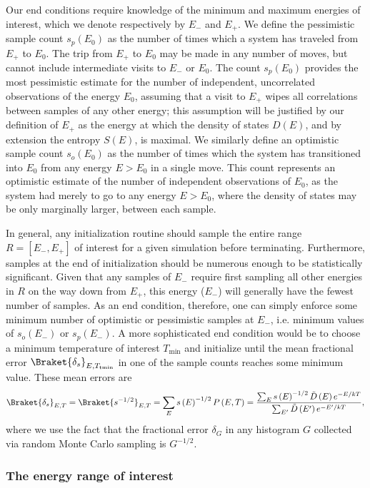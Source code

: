 \documentclass[11pt]{article}
\newcommand{\bk}{\Braket} %
\renewcommand{\t}{\text} %
\newcommand{\f}[2]{\dfrac{#1}{#2}} %
\newcommand{\p}[1]{\left(#1\right)} %
\renewcommand{\sp}[1]{\left[#1\right]} %
\begin{document}
Our end conditions require knowledge of the minimum and maximum
energies of interest, which we denote respectively by $E_-$ and $E_+$.
We define the pessimistic sample count $s_p\p{E_0}$ as the number of
times which a system has traveled from $E_+$ to $E_0$. The trip from
$E_+$ to $E_0$ may be made in any number of moves, but cannot include
intermediate visits to $E_-$ or $E_0$. The count $s_p\p{E_0}$ provides
the most pessimistic estimate for the number of independent,
uncorrelated observations of the energy $E_0$, assuming that a visit
to $E_+$ wipes all correlations between samples of any other energy;
this assumption will be justified by our definition of $E_+$ as the
energy at which the density of states $D\p{E}$, and by extension the
entropy $S\p{E}$, is maximal. We similarly define an optimistic sample
count $s_o\p{E_0}$ as the number of times which the system has
transitioned into $E_0$ from any energy $E>E_0$ in a single move. This
count represents an optimistic estimate of the number of independent
observations of $E_0$, as the system had merely to go to any energy
$E>E_0$, where the density of states may be only marginally larger,
between each sample.

In general, any initialization routine should sample the entire range
$R=\sp{E_-,E_+}$ of interest for a given simulation before
terminating. Furthermore, samples at the end of initialization should
be numerous enough to be statistically significant. Given that any
samples of $E_-$ require first sampling all other energies in $R$ on
the way down from $E_+$, this energy ($E_-$) will generally have the
fewest number of samples. As an end condition, therefore, one can
simply enforce some minimum number of optimistic or pessimistic
samples at $E_-$, i.e. minimum values of $s_o\p{E_-}$ or
$s_p\p{E_-}$. A more sophisticated end condition would be to choose a
minimum temperature of interest $T_{\t{min}}$ and initialize until the
mean fractional error $\bk{\delta_s}_{E,T_{\t{tmin}}}$ in one of the
sample counts reaches some minimum value. These mean errors are
\begin{align}
  \bk{\delta_s}_{E,T}=\bk{s^{-1/2}}_{E,T}=\sum_Es\p{E}^{-1/2}P\p{E,T}
  =\f{\sum_Es\p{E}^{-1/2}\tilde D\p{E}e^{-E/kT}}{\sum_{E'}\tilde
    D\p{E'}e^{-E'/kT}},
  \label{eq:fractional_sample_error}
\end{align}
where we use the fact that the fractional error $\delta_G$ in any
histogram $G$ collected via random Monte Carlo sampling is $G^{-1/2}$.

\subsubsection{The energy range of interest}
\label{sec:min_energy}
\end{document}
